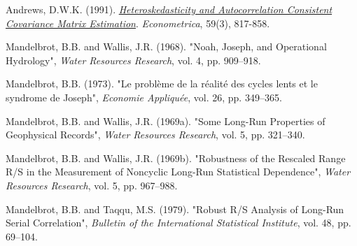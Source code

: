 \documentclass[11pt]{extarticle}
\begin{document}
Andrews, D.W.K. (1991). \textit{\href{https://www.jstor.org/stable/2938229}{Heteroskedasticity and Autocorrelation Consistent Covariance Matrix Estimation}}. \textit{Econometrica}, 59(3), 817-858.

Mandelbrot, B.B. and Wallis, J.R. (1968). "Noah, Joseph, and Operational Hydrology", \textit{Water Resources Research}, vol. 4, pp. 909--918.

Mandelbrot, B.B. (1973). "Le problème de la réalité des cycles lents et le syndrome de Joseph", \textit{Economie Appliquée}, vol. 26, pp. 349--365.

Mandelbrot, B.B. and Wallis, J.R. (1969a). "Some Long-Run Properties of Geophysical Records", \textit{Water Resources Research}, vol. 5, pp. 321--340.

Mandelbrot, B.B. and Wallis, J.R. (1969b). "Robustness of the Rescaled Range R/S in the Measurement of Noncyclic Long-Run Statistical Dependence", \textit{Water Resources Research}, vol. 5, pp. 967--988.

Mandelbrot, B.B. and Taqqu, M.S. (1979). "Robust R/S Analysis of Long-Run Serial Correlation", \textit{Bulletin of the International Statistical Institute}, vol. 48, pp. 69--104.
\end{document}
